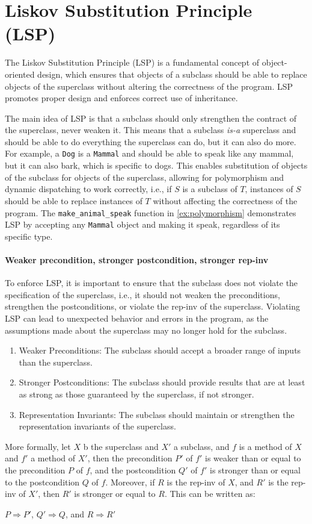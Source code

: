 \documentclass[oneside,11pt,dvipsnames]{book}
\newcommand{\code}[1]{\texttt{#1}}
\begin{document}
\section{Liskov Substitution Principle (LSP)}
The Liskov Substitution Principle (LSP) is a fundamental concept of object-oriented design, which ensures that objects of a subclass should be able to replace objects of the superclass without altering the correctness of the program. LSP promotes proper design and enforces correct use of inheritance.

The main idea of LSP is that a subclass should only strengthen the contract of the superclass, never weaken it.  This means that a subclass \emph{is-a} superclass and should be able to do everything the superclass can do, but it can also do more. For example, a \code{Dog} is a \code{Mammal} and should be able to speak like any mammal, but it can also bark, which is specific to dogs.
This enables substitution of objects of the subclass for objects of the superclass, allowing for polymorphism and dynamic dispatching to work correctly, i.e., if $S$ is a subclass of $T$, instances of $S$ should be able to replace instances of $T$ without affecting the correctness of the program. The \code{make\_animal\_speak} function in \autoref{ex:polymorphism} demonstrates LSP by accepting any \code{Mammal} object and making it speak, regardless of its specific type.

\paragraph{Weaker precondition, stronger postcondition, stronger rep-inv} To enforce LSP, it is important to ensure that the subclass does not violate the specification of the superclass, i.e., it should not weaken the preconditions, strengthen the postconditions, or violate the rep-inv of the superclass. Violating LSP can lead to unexpected behavior and errors in the program, as the assumptions made about the superclass may no longer hold for the subclass. 

\begin{enumerate}
	\item Weaker Preconditions: The subclass should accept a broader range of inputs than the superclass.
	\item Stronger Postconditions: The subclass should provide results that are at least as strong as those guaranteed by the superclass, if not stronger.
	\item Representation Invariants: The subclass should maintain or strengthen the representation invariants of the superclass.
\end{enumerate}
More formally, let $X$ b the superclass and $X'$ a subclass, and $f$ is a method of $X$ and $f'$ a method of $X'$, then the precondition $P'$ of $f'$ is weaker than or equal to the precondition $P$ of $f$, and the postcondition $Q'$ of $f'$ is stronger than or equal to the postcondition $Q$ of $f$. Moreover, if $R$ is the rep-inv of $X$, and $R'$ is the rep-inv of $X'$, then $R'$ is stronger or equal to $R$. This can be written as:
\begin{center}
    $P \Rightarrow P'$, $Q' \Rightarrow Q$, and $R \Rightarrow R'$  
\end{center}
\end{document}
